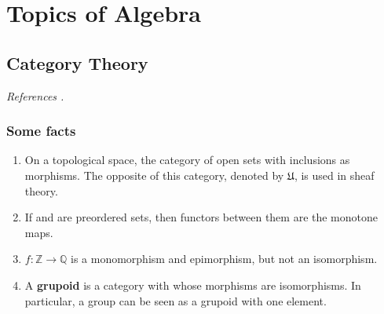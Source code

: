 \part{Topics of Algebra}


\chapter{Category Theory}

\textit{References \cite{adamekAbstractConcreteCategories,richterCategoriesHomotopyTheory2020}.} %


\section{Some facts}  

\begin{example}
    \begin{enumerate}
        \item On a topological space, the category of open sets with inclusions as morphisms. The opposite of this category, denoted by $\mathfrak{U}$, is used in sheaf theory.
        \item If \ca and \cb are preordered sets, then functors between them are the monotone maps.
        \item $f: \mathbb{Z} \rightarrow \mathbb{Q}$ is a monomorphism and epimorphism, but not an isomorphism.
        \item A \textbf{grupoid} is a category with whose morphisms are isomorphisms. In particular, a group can be seen as a grupoid with one element.
    \end{enumerate}
\end{example}
\medspace


